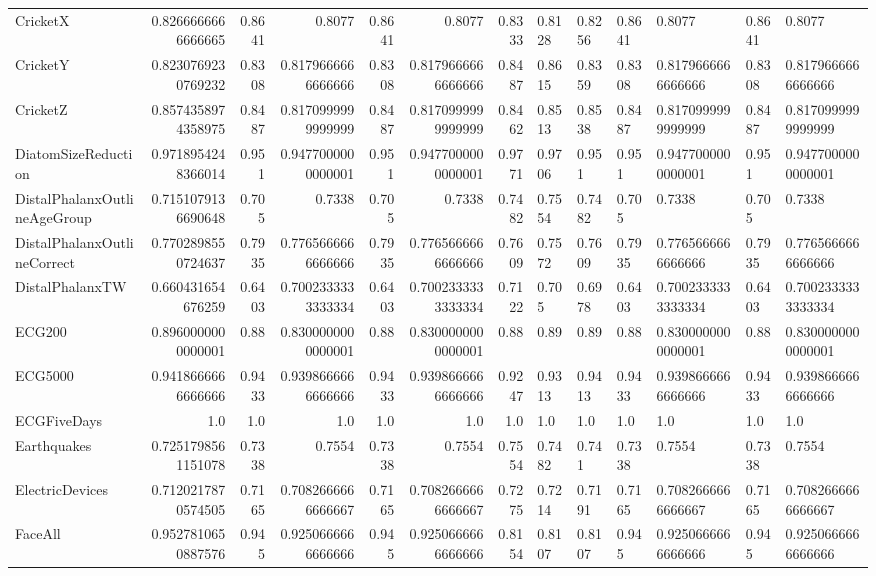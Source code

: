 \begin{table}[t]
\begin{tabular}{lrrrrrr}
CricketX & 0.8266666666666665 & 0.8641 & 0.8077 & 0.8641 & 0.8077 & 0.8333 & 0.8128 & 0.8256 & 0.8641 & 0.8077 & 0.8641 & 0.8077 \\
CricketY & 0.8230769230769232 & 0.8308 & 0.8179666666666666 & 0.8308 & 0.8179666666666666 & 0.8487 & 0.8615 & 0.8359 & 0.8308 & 0.8179666666666666 & 0.8308 & 0.8179666666666666 \\
CricketZ & 0.8574358974358975 & 0.8487 & 0.8170999999999999 & 0.8487 & 0.8170999999999999 & 0.8462 & 0.8513 & 0.8538 & 0.8487 & 0.8170999999999999 & 0.8487 & 0.8170999999999999 \\
DiatomSizeReduction & 0.9718954248366014 & 0.951 & 0.9477000000000001 & 0.951 & 0.9477000000000001 & 0.9771 & 0.9706 & 0.951 & 0.951 & 0.9477000000000001 & 0.951 & 0.9477000000000001 \\
DistalPhalanxOutlineAgeGroup & 0.7151079136690648 & 0.705 & 0.7338 & 0.705 & 0.7338 & 0.7482 & 0.7554 & 0.7482 & 0.705 & 0.7338 & 0.705 & 0.7338 \\
DistalPhalanxOutlineCorrect & 0.7702898550724637 & 0.7935 & 0.7765666666666666 & 0.7935 & 0.7765666666666666 & 0.7609 & 0.7572 & 0.7609 & 0.7935 & 0.7765666666666666 & 0.7935 & 0.7765666666666666 \\
DistalPhalanxTW & 0.660431654676259 & 0.6403 & 0.7002333333333334 & 0.6403 & 0.7002333333333334 & 0.7122 & 0.705 & 0.6978 & 0.6403 & 0.7002333333333334 & 0.6403 & 0.7002333333333334 \\
ECG200 & 0.8960000000000001 & 0.88 & 0.8300000000000001 & 0.88 & 0.8300000000000001 & 0.88 & 0.89 & 0.89 & 0.88 & 0.8300000000000001 & 0.88 & 0.8300000000000001 \\
ECG5000 & 0.9418666666666666 & 0.9433 & 0.9398666666666666 & 0.9433 & 0.9398666666666666 & 0.9247 & 0.9313 & 0.9413 & 0.9433 & 0.9398666666666666 & 0.9433 & 0.9398666666666666 \\
ECGFiveDays & 1.0 & 1.0 & 1.0 & 1.0 & 1.0 & 1.0 & 1.0 & 1.0 & 1.0 & 1.0 & 1.0 & 1.0 \\
Earthquakes & 0.7251798561151078 & 0.7338 & 0.7554 & 0.7338 & 0.7554 & 0.7554 & 0.7482 & 0.741 & 0.7338 & 0.7554 & 0.7338 & 0.7554 \\
ElectricDevices & 0.7120217870574505 & 0.7165 & 0.7082666666666667 & 0.7165 & 0.7082666666666667 & 0.7275 & 0.7214 & 0.7191 & 0.7165 & 0.7082666666666667 & 0.7165 & 0.7082666666666667 \\
FaceAll & 0.9527810650887576 & 0.945 & 0.9250666666666666 & 0.945 & 0.9250666666666666 & 0.8154 & 0.8107 & 0.8107 & 0.945 & 0.9250666666666666 & 0.945 & 0.9250666666666666 \\

\end{tabular}
\end{table}
